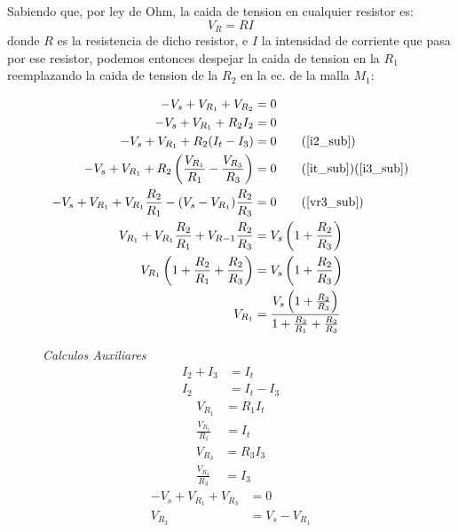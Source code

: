 \documentclass[a4paper,12pt, spanish]{report}
\begin{document}
      Sabiendo que, por ley de Ohm, la caida de tension en cualquier resistor es:
      \begin{equation}
        V_R = R I
      \end{equation}
      donde $R$ es la resistencia de dicho resistor, e $I$ la intensidad de corriente que pasa por ese resistor,
      podemos entonces despejar la caida de tension en la $R_1$ reemplazando la caida de tension de la $R_2$ en la ec.
      de la malla $M_1$:
      \begin{figure}[!h]
        \centering
        \begin{minipage}{0.6\textwidth}
          \centering
          \begin{align*}
            -V_s + V_{R_1} + V_{R_2} &= 0\\
            -V_s + V_{R_1} + R_2 I_2 &= 0\\
            -V_s + V_{R_1} + R_2 (I_t - I_3) &= 0\tag*{\hfill(\ref{i2_sub})}\\
            -V_s + V_{R_1} + R_2 \left(\frac{V_{R_1}}{R_1} - \frac{V_{R_3}}{R_3}\right) &= 0\tag*{\hfill(\ref{it_sub})(\ref{i3_sub})}\\
            -V_s + V_{R_1} + V_{R_1} \frac{R_2}{R_1} - (V_s - V_{R_1}) \frac{R_2}{R_3} &= 0\tag*{\hfill(\ref{vr3_sub})}\\
            V_{R_1} + V_{R_1} \frac{R_2}{R_1} + V_{R-1} \frac{R_2}{R_3} &= V_s \left(1 + \frac{R_2}{R_3}\right)\\
            V_{R_1} \left(1 + \frac{R_2}{R_1} + \frac{R_2}{R_3}\right) &= V_s \left(1 + \frac{R_2}{R_3}\right)\\
            V_{R_1} &= \frac{V_s \left(1 + \frac{R_2}{R_3}\right)}{1 + \frac{R_2}{R_1} + \frac{R_2}{R_3}}
          \end{align*}
        \end{minipage}
        \vline
        \centering
        \begin{minipage}{0.35\textwidth}
          \centering
          \textit{Calculos Auxiliares}
          \begin{align}
            I_2 + I_3 &= I_t\nonumber\\
            I_2 &= I_t - I_3\tag{a}
            \label{i2_sub}
          \end{align}
          \begin{align}
            V_{R_1} &= R_1 I_t\nonumber\\
            \frac{V_{R_1}}{R_1} &= I_t\tag{b}
            \label{it_sub}
          \end{align}
          \begin{align}
            V_{R_3} &= R_3 I_3\nonumber\\
            \frac{V_{R_3}}{R_3} &= I_3\tag{c}
            \label{i3_sub}
          \end{align}
          \begin{align}
            -V_s + V_{R_1} + V_{R_3} &= 0\nonumber\\
            V_{R_3} &= V_s - V_{R_1}\tag{d}
            \label{vr3_sub}
          \end{align}
        \end{minipage}
      \end{figure}
\end{document}
